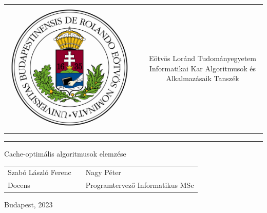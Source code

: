 \documentclass[12pt]{report}
\begin{document}
\begin{titlepage}
\vspace*{0cm}
\centering
\begin{tabular}{cp{2cm}c}
\begin{minipage}{4cm}
\vspace{0pt}
\includegraphics[width=1\textwidth]{eltecimerszines}
\end{minipage} & &
\begin{minipage}{7cm}
\vspace{0pt}Eötvös Loránd Tudományegyetem \vspace{10pt} \newline
Informatikai Kar \vspace{10pt} \newline
Algoritmusok és Alkalmazásaik \newline
Tanszék
\end{minipage}
\end{tabular}

\vspace*{0.2cm}
\rule{\textwidth}{1pt}

\vspace*{6cm}
{\Huge Cache-optimális algoritmusok elemzése}

\vspace*{5cm}
\begin{tabular}{lp{3cm}l}
Szabó László Ferenc & & Nagy Péter\\
Docens & & Programtervező Informatikus MSc
\end{tabular}

\vfill

\vspace*{1cm}
Budapest, 2023
\end{titlepage}
\end{document}
